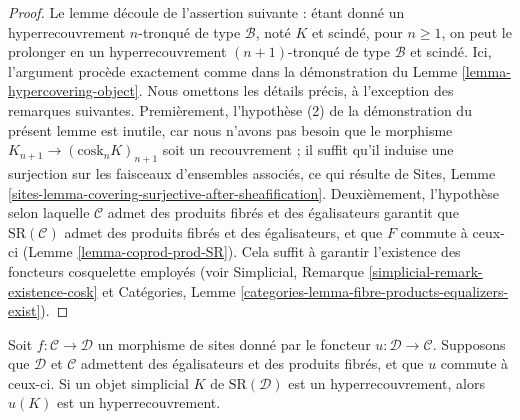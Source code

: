 \begin{proof}
\medskip\noindent
Le lemme découle de l'assertion suivante : étant donné un
hyperrecouvrement $n$-tronqué de type $\mathcal{B}$, noté $K$ et scindé, pour $n \geq 1$,
on peut le prolonger en un hyperrecouvrement $(n + 1)$-tronqué de type $\mathcal{B}$ et scindé.
Ici, l'argument procède exactement comme dans la démonstration du
Lemme \ref{lemma-hypercovering-object}.
Nous omettons les détails précis, à l'exception des remarques suivantes.
Premièrement, l'hypothèse (2) de la démonstration du présent
lemme est inutile, car nous n'avons pas besoin que le morphisme
$K_{n + 1} \to (\text{cosk}_n K)_{n + 1}$ soit un recouvrement ;
il suffit qu'il induise une surjection sur les faisceaux d'ensembles associés,
ce qui résulte de
Sites, Lemme \ref{sites-lemma-covering-surjective-after-sheafification}.
Deuxièmement, l'hypothèse selon laquelle $\mathcal{C}$ admet des produits fibrés et des égalisateurs
garantit que $\text{SR}(\mathcal{C})$ admet des produits fibrés
et des égalisateurs, et que $F$ commute à ceux-ci
(Lemme \ref{lemma-coprod-prod-SR}). Cela suffit à
garantir l'existence des foncteurs cosquelette employés (voir
Simplicial, Remarque \ref{simplicial-remark-existence-cosk} et
Catégories, Lemme \ref{categories-lemma-fibre-products-equalizers-exist}).
\end{proof}

\begin{lemma}
\label{lemma-hypercovering-morphism-sites}
Soit $f : \mathcal{C} \to \mathcal{D}$ un morphisme de sites
donné par le foncteur $u : \mathcal{D} \to \mathcal{C}$.
Supposons que $\mathcal{D}$ et $\mathcal{C}$ admettent des égalisateurs et des
produits fibrés, et que $u$ commute à ceux-ci.
Si un objet simplicial $K$ de $\text{SR}(\mathcal{D})$
est un hyperrecouvrement, alors $u(K)$ est un hyperrecouvrement.
\end{lemma}

